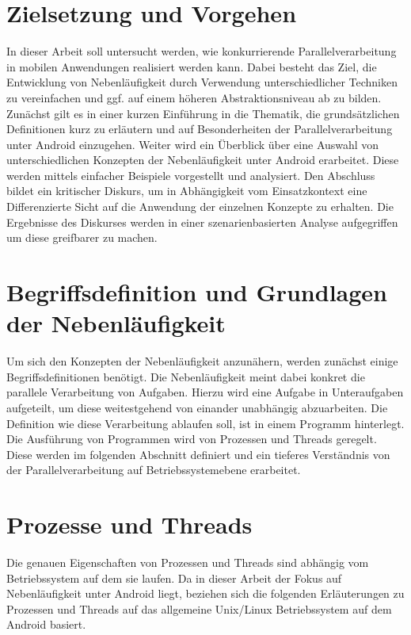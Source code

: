 \documentclass[12pt,oneside,a4paper,bibtotoc,liststotoc]{scrreprt}
\begin{document}
\section{Zielsetzung und Vorgehen}
In dieser Arbeit soll untersucht werden, wie konkurrierende Parallelverarbeitung in mobilen Anwendungen realisiert werden kann. Dabei besteht das Ziel, die Entwicklung von Nebenläufigkeit durch Verwendung unterschiedlicher Techniken zu vereinfachen und ggf. auf einem höheren Abstraktionsniveau ab zu bilden. Zunächst gilt es in einer kurzen Einführung in die Thematik, die grundsätzlichen Definitionen kurz zu erläutern und auf Besonderheiten der Parallelverarbeitung unter Android einzugehen. Weiter wird ein Überblick über eine Auswahl von unterschiedlichen Konzepten der Nebenläufigkeit unter Android erarbeitet. Diese werden mittels einfacher Beispiele vorgestellt und analysiert. Den Abschluss bildet ein kritischer Diskurs, um in Abhängigkeit vom Einsatzkontext eine Differenzierte Sicht auf die Anwendung der einzelnen Konzepte zu erhalten. Die Ergebnisse des Diskurses werden in einer szenarienbasierten Analyse aufgegriffen um diese greifbarer zu machen.

\section{Begriffsdefinition und Grundlagen der Nebenläufigkeit}
Um sich den Konzepten der Nebenläufigkeit anzunähern, werden zunächst einige Begriffsdefinitionen benötigt. Die Nebenläufigkeit meint dabei konkret die parallele Verarbeitung von Aufgaben. Hierzu wird eine Aufgabe in Unteraufgaben aufgeteilt, um diese  weitestgehend von einander unabhängig abzuarbeiten. Die Definition wie diese Verarbeitung ablaufen soll, ist in einem Programm hinterlegt. Die Ausführung von Programmen wird von Prozessen und Threads geregelt. Diese werden im folgenden Abschnitt definiert und ein tieferes Verständnis von der Parallelverarbeitung auf Betriebssystemebene erarbeitet.

\section{Prozesse und Threads}
Die genauen Eigenschaften von Prozessen und Threads sind abhängig vom Betriebssystem auf dem sie laufen. Da in dieser Arbeit der Fokus auf Nebenläufigkeit unter Android liegt, beziehen sich die folgenden Erläuterungen zu Prozessen und Threads auf das allgemeine Unix/Linux Betriebssystem auf dem Android basiert.
\end{document}
